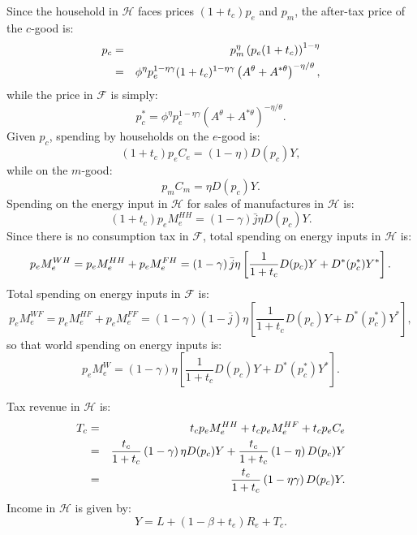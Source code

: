 \documentclass[notitlepage,12pt]{article}
\begin{document}
Since the household in $\mathcal{H}$ faces prices $(1+t_{c})p_{e}$ and $p_{m}
$, the after-tax price of the $c$-good is:%
\begin{eqnarray}
p_{c} &=&p_{m}^{\eta }\left( p_{e}(1+t_{c})\right) ^{1-\eta }  \notag \\
&=&\phi ^{\eta }p_{e}^{1-\eta \gamma }(1+t_{c})^{1-\eta \gamma }\left(
A^{\theta }+A^{\ast \theta }\right) ^{-\eta /\theta },
\label{p_c home consumption tax1}
\end{eqnarray}%
while the price in $\mathcal{F}$ is simply:%
\begin{equation}
p_{c}^{\ast }=\phi ^{\eta }p_{e}^{1-\eta \gamma }\left( A^{\theta }+A^{\ast
\theta }\right) ^{-\eta /\theta }.  \label{p_c star home consumption tax}
\end{equation}%
Given $p_{c}$, spending by households on the $e$-good is:%
\begin{equation*}
(1+t_{c})p_{e}C_{e}=\left( 1-\eta \right) D(p_{c})Y,
\end{equation*}%
while on the $m$-good:%
\begin{equation*}
p_{m}C_{m}=\eta D(p_{c})Y.
\end{equation*}%
Spending on the energy input in $\mathcal{H}$ for sales of manufactures in $%
\mathcal{H}$ is:%
\begin{equation*}
(1+t_{c})p_{e}M_{e}^{HH}=\left( 1-\gamma \right) \bar{j}\eta D(p_{c})Y.
\end{equation*}%
Since there is no consumption tax in $\mathcal{F}$, total spending on energy
inputs in $\mathcal{H}$ is:%
\begin{equation*}
p_{e}M_{e}^{WH}=p_{e}M_{e}^{HH}+p_{e}M_{e}^{FH}=\left( 1-\gamma \right) \bar{%
j}\eta \left[ \frac{1}{1+t_{c}}D(p_{c})Y+D^{\ast }(p_{c}^{\ast })Y^{\ast }%
\right] .
\end{equation*}%
Total spending on energy inputs in $\mathcal{F}$ is:%
\begin{equation*}
p_{e}M_{e}^{WF}=p_{e}M_{e}^{HF}+p_{e}M_{e}^{FF}=\left( 1-\gamma \right)
\left( 1-\bar{j}\right) \eta \left[ \frac{1}{1+t_{c}}D(p_{c})Y+D^{\ast
}(p_{c}^{\ast })Y^{\ast }\right] ,
\end{equation*}%
so that world spending on energy inputs is:%
\begin{equation*}
p_{e}M_{e}^{W}=\left( 1-\gamma \right) \eta \left[ \frac{1}{1+t_{c}}%
D(p_{c})Y+D^{\ast }(p_{c}^{\ast })Y^{\ast }\right] .
\end{equation*}

Tax revenue in $\mathcal{H}$ is:%
\begin{eqnarray*}
T_{c} &=&t_{c}p_{e}M_{e}^{HH}+t_{c}p_{e}M_{e}^{HF}+t_{c}p_{e}C_{e} \\
&=&\frac{t_{c}}{1+t_{c}}\left( 1-\gamma \right) \eta D(p_{c})Y+\frac{t_{c}}{%
1+t_{c}}\left( 1-\eta \right) D(p_{c})Y \\
&=&\frac{t_{c}}{1+t_{c}}\left( 1-\eta \gamma \right) D(p_{c})Y.
\end{eqnarray*}%
Income in $\mathcal{H}$ is given by:%
\begin{equation}
Y=L+\left( 1-\beta +t_{e}\right) R_{e}+T_{c}.  \label{Y home consumption tax}
\end{equation}
\end{document}
